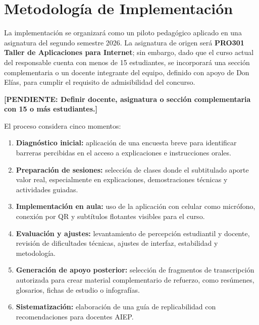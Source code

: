 \documentclass[11pt,letterpaper]{article}
\newcommand{\pending}[1]{\textcolor{PendingRed}{\textbf{[PENDIENTE: #1]}}}
\begin{document}
\section{Metodología de Implementación}

La implementación se organizará como un piloto pedagógico aplicado en una asignatura del segundo semestre 2026. La asignatura de origen será \textbf{PRO301 Taller de Aplicaciones para Internet}; sin embargo, dado que el curso actual del responsable cuenta con menos de 15 estudiantes, se incorporará una sección complementaria o un docente integrante del equipo, definido con apoyo de Don Elías, para cumplir el requisito de admisibilidad del concurso.

\pending{Definir docente, asignatura o sección complementaria con 15 o más estudiantes.}

El proceso considera cinco momentos:

\begin{enumerate}
  \item \textbf{Diagnóstico inicial:} aplicación de una encuesta breve para identificar barreras percibidas en el acceso a explicaciones e instrucciones orales.
  \item \textbf{Preparación de sesiones:} selección de clases donde el subtitulado aporte valor real, especialmente en explicaciones, demostraciones técnicas y actividades guiadas.
  \item \textbf{Implementación en aula:} uso de la aplicación con celular como micrófono, conexión por QR y subtítulos flotantes visibles para el curso.
  \item \textbf{Evaluación y ajustes:} levantamiento de percepción estudiantil y docente, revisión de dificultades técnicas, ajustes de interfaz, estabilidad y metodología.
  \item \textbf{Generación de apoyo posterior:} selección de fragmentos de transcripción autorizada para crear material complementario de refuerzo, como resúmenes, glosarios, fichas de estudio o infografías.
  \item \textbf{Sistematización:} elaboración de una guía de replicabilidad con recomendaciones para docentes AIEP.
\end{enumerate}
\end{document}
